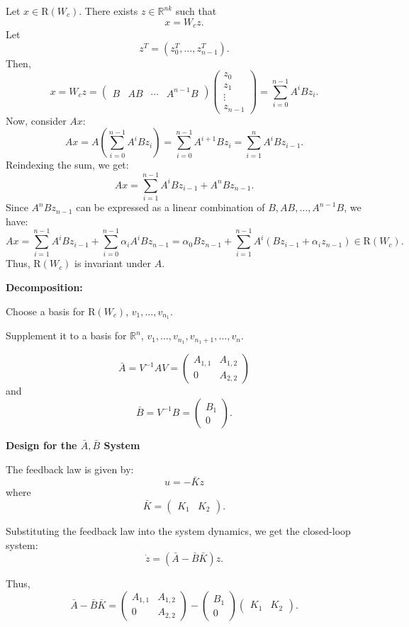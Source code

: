 \documentclass{article}
\begin{document}
Let \( x \in \text{R}(W_c) \). There exists \( z \in \mathbb{R}^{nk} \) such that
\[
x = W_c z.
\]
Let
\[
z^T = (z_0^T, \ldots, z_{n-1}^T).
\]
Then,
\[
x = W_c z = \begin{pmatrix} B & AB & \cdots & A^{n-1}B \end{pmatrix} \begin{pmatrix} z_0 \\ z_1 \\ \vdots \\ z_{n-1} \end{pmatrix} = \sum_{i=0}^{n-1} A^i B z_i.
\]
Now, consider \( Ax \):
\[
Ax = A \left( \sum_{i=0}^{n-1} A^i B z_i \right) = \sum_{i=0}^{n-1} A^{i+1} B z_i = \sum_{i=1}^{n} A^i B z_{i-1}.
\]
Reindexing the sum, we get:
\[
Ax = \sum_{i=1}^{n-1} A^i B z_{i-1} + A^n B z_{n-1}.
\]
Since \( A^n B z_{n-1} \) can be expressed as a linear combination of \( B, AB, \ldots, A^{n-1}B \), we have:
\[
Ax = \sum_{i=1}^{n-1} A^i B z_{i-1} + \sum_{i=0}^{n-1} \alpha_i A^i B z_{n-1} = \alpha_0 B z_{n-1} + \sum_{i=1}^{n-1} A^i (B z_{i-1} + \alpha_i z_{n-1}) \in \text{R}(W_c).
\]
Thus, \( \text{R}(W_c) \) is invariant under \( A \).

\textbf{Decomposition:}

Choose a basis for $\text{R}(W_c)$, $v_1, \ldots, v_{n_1}$.

Supplement it to a basis for $\mathbb{R}^n$, $v_1, \ldots, v_{n_1}, v_{n_1+1}, \ldots, v_n$.

\[
\bar{A} = V^{-1}AV = \begin{pmatrix}
A_{1,1} & A_{1,2} \\
0 & A_{2,2}
\end{pmatrix}
\]
and
\[
\bar{B} = V^{-1}B = \begin{pmatrix}
B_1 \\
0
\end{pmatrix}.
\]

\textbf{Design for the $\bar{A}, \bar{B}$ System}

The feedback law is given by:
\[
u = -\bar{K}z
\]
where
\[
\bar{K} = \begin{pmatrix}
K_1 & K_2
\end{pmatrix}.
\]

Substituting the feedback law into the system dynamics, we get the closed-loop system:
\[
\dot{z} = (\bar{A} - \bar{B}\bar{K})z.
\]

Thus,
\[
\bar{A} - \bar{B}\bar{K} = \begin{pmatrix}
A_{1,1} & A_{1,2} \\
0 & A_{2,2}
\end{pmatrix} - \begin{pmatrix}
B_1 \\
0
\end{pmatrix} \begin{pmatrix}
K_1 & K_2
\end{pmatrix}.
\]
\end{document}
